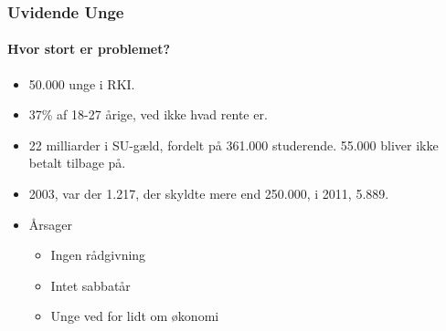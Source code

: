 
\begin{frame}
\frametitle{Uvidende Unge}
\framesubtitle{Hvor stort er problemet?} %
    \begin{itemize}
        \item{50.000 unge i RKI.}
        \item{37\% af 18-27 årige, ved ikke hvad rente er.}
        \item{22 milliarder i SU-gæld, fordelt på 361.000 studerende. 55.000 bliver ikke betalt tilbage på.}
        \item{2003, var der 1.217, der skyldte mere end 250.000, i 2011, 5.889.}
        \item{Årsager}
        	\begin{itemize}
        	\item{Ingen rådgivning}
        	\item{Intet sabbatår}
        	\item{Unge ved for lidt om økonomi}
        	\end{itemize}
    \end{itemize}
\end{frame}

